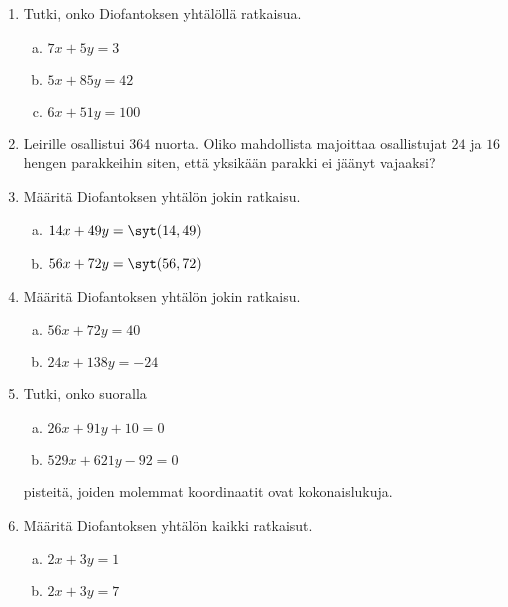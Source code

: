 


\Harjoitustehtavat

\begin{enumerate}

\item Tutki, onko Diofantoksen yhtälöllä ratkaisua.
\begin{enumerate}[a)]
\item $7x + 5y = 3$
\item $5x + 85y = 42$
\item $6x + 51y = 100$
\end{enumerate}

\item Leirille osallistui $364$ nuorta. Oliko mahdollista majoittaa osallistujat $24$ ja $16$ hengen parakkeihin siten, että yksikään parakki ei jäänyt vajaaksi?

\item Määritä Diofantoksen yhtälön jokin ratkaisu.
\begin{enumerate}[a)]
\item $14x + 49y = \syt(14, 49)$
\item $56x + 72y = \syt(56, 72)$
\end{enumerate}

\item Määritä Diofantoksen yhtälön jokin ratkaisu.
\begin{enumerate}[a)]
\item $56x + 72y = 40$
\item $24x + 138y = -24$
\end{enumerate}

\item Tutki, onko suoralla
\begin{enumerate}[a)]
\item $26x + 91y + 10 = 0$
\item $529x + 621y - 92 = 0$
\end{enumerate}
pisteitä, joiden molemmat koordinaatit ovat kokonaislukuja.

\item Määritä Diofantoksen yhtälön kaikki ratkaisut.
\begin{enumerate}[a)]
\item $2x + 3y = 1$
\item $2x + 3y = 7$
\end{enumerate}


\end{enumerate}
